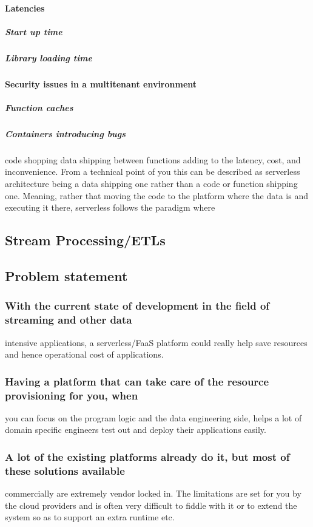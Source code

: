 \documentclass[12pt]{article}
\begin{document}
\paragraph{Latencies}
\label{sec:org3fae6c1}
\subparagraph{Start up time}
\label{sec:org8c330da}
\subparagraph{Library loading time}
\label{sec:org017830b}
\paragraph{Security issues in a multitenant environment}
\label{sec:orgad6b1e8}
\subparagraph{Function caches}
\label{sec:org380b40b}
\subparagraph{Containers introducing bugs}
\label{sec:org9876714}
code shopping data shipping
between functions adding to the latency, cost, and inconvenience. From a
technical point of you this can be described as serverless architecture being a
data shipping one rather than a code or function shipping one. Meaning, rather
that moving the code to the platform where the data is and executing it there,
serverless follows the paradigm where  
\subsection{Stream Processing/ETLs}
\label{sec:org864676f}
\subsection{Problem statement}
\label{sec:org6b9ca29}
\subsubsection{With the current state of development in the field of streaming and other data}
\label{sec:orgdfd542b}
intensive applications, a serverless/FaaS platform could really help save
resources and hence operational cost of applications.
\subsubsection{Having a platform that can take care of the resource provisioning for you, when}
\label{sec:orgbd9fd4f}
you can focus on the program logic and the data engineering side, helps a lot of
domain specific engineers test out and deploy their applications easily.
\subsubsection{A lot of the existing platforms already do it, but most of these solutions available}
\label{sec:org5525ab4}
commercially are extremely vendor locked in. The limitations are set for you by
the cloud providers and is often very difficult to fiddle with it or to extend
the system so as to support an extra runtime etc.
\end{document}
